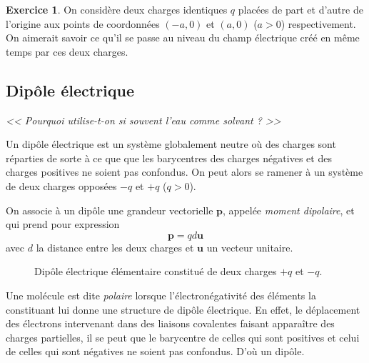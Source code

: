 \documentclass{article}
\renewcommand{\vec}[1]{\boldsymbol{\mathbf{#1}}}
\theoremstyle{definition}
\newtheorem{exo}{Exercice}
\theoremstyle{remark}
\begin{document}
\begin{exo}
	On considère deux charges identiques $q$ placées de part et d'autre de l'origine aux points de coordonnées $(-a,0)$ et $(a,0)$ ($a>0$) respectivement. On aimerait savoir ce qu'il se passe au niveau du champ électrique créé en même temps par ces deux charges.
\end{exo}

\subsection{Dipôle électrique}

\begin{center}
	\textit{<< Pourquoi utilise-t-on si souvent l'eau comme solvant ? >>}
\end{center}

Un dipôle électrique est un système globalement neutre où des charges sont réparties de sorte à ce que que les barycentres des charges négatives et des charges positives ne soient pas confondus. On peut alors se ramener à un système de deux charges opposées $-q$ et $+q$ ($q>0$).

On associe à un dipôle une grandeur vectorielle $\vec{p}$, appelée \textit{moment dipolaire}, et qui prend pour expression
	\[ 
	\vec{p} = qd\vec{u}
	 \]
avec $d$ la distance entre les deux charges et $\vec{u}$ un vecteur unitaire.

\begin{figure}[H]
	\centering
	\caption{Dipôle électrique élémentaire constitué de deux charges $+q$ et $-q$.}
\end{figure}

Une molécule est dite \textit{polaire} lorsque l'électronégativité des éléments la constituant lui donne une structure de dipôle électrique. En effet, le déplacement des électrons intervenant dans des liaisons covalentes faisant apparaître des charges partielles, il se peut que le barycentre de celles qui sont positives et celui de celles qui sont négatives ne soient pas confondus. D'où un dipôle.
\end{document}
